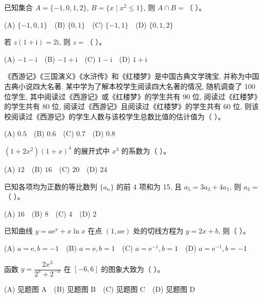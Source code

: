\begin{question}
已知集合 $A = \{-1, 0, 1, 2\}$, $B = \{x \mid x^2 \leqslant 1\}$, 则 $A \cap B =$（ ）。

(A) $\{-1, 0, 1\}$　(B) $\{0, 1\}$　(C) $\{-1, 1\}$　(D) $\{0, 1, 2\}$

\end{question}
\begin{question}
若 $z(1 + \mathrm{i}) = 2\mathrm{i}$, 则 $z =$（ ）。

(A) $-1 - \mathrm{i}$　(B) $-1 + \mathrm{i}$　(C) $1 - \mathrm{i}$　(D) $1 + \mathrm{i}$

\end{question}
\begin{question}
《西游记》《三国演义》《水浒传》和《红楼梦》是中国古典文学瑰宝, 并称为中国古典小说四大名著. 某中学为了解本校学生阅读四大名著的情况, 随机调查了 100 位学生, 其中阅读过《西游记》或《红楼梦》的学生共有 90 位, 阅读过《红楼梦》的学生共有 80 位, 阅读过《西游记》且阅读过《红楼梦》的学生共有 60 位, 则该校阅读过《西游记》的学生人数与该校学生总数比值的估计值为（ ）。

(A) $0.5$　(B) $0.6$　(C) $0.7$　(D) $0.8$

\end{question}
\begin{question}
$(1 + 2x^2)(1 + x)^4$ 的展开式中 $x^3$ 的系数为（ ）。

(A) $12$　(B) $16$　(C) $20$　(D) $24$

\end{question}
\begin{question}
已知各项均为正数的等比数列 $\{a_n\}$ 的前 4 项和为 15, 且 $a_5 = 3a_3 + 4a_1$, 则 $a_3 =$（ ）。

(A) $16$　(B) $8$　(C) $4$　(D) $2$

\end{question}
\begin{question}
已知曲线 $y = a\mathrm{e}^x + x \ln x$ 在点 $(1, a\mathrm{e})$ 处的切线方程为 $y = 2x + b$, 则（ ）。

(A) $a = \mathrm{e}, b = -1$　(B) $a = \mathrm{e}, b = 1$　(C) $a = \mathrm{e}^{-1}, b = 1$　(D) $a = \mathrm{e}^{-1}, b = -1$

\Needspace{0.4\textheight}
\end{question}
\begin{question}
函数 $y = \dfrac{2x^3}{2^x + 2^{-x}}$ 在 $[-6, 6]$ 的图象大致为（ ）。
\nopagebreak[4]
\begin{center}\end{center}
\nopagebreak[4]
(A) 见题图 A　(B) 见题图 B　(C) 见题图 C　(D) 见题图 D

\Needspace{0.4\textheight}
\end{question}
